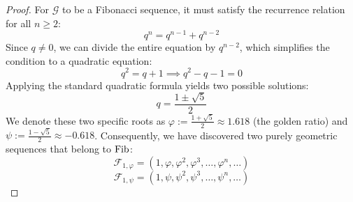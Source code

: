 \begin{proof}
For $\mathcal{G}$ to be a Fibonacci sequence, it must satisfy the recurrence relation for all $n \ge 2$:
\[
q^n = q^{n-1} + q^{n-2}
\]
Since $q \ne 0$, we can divide the entire equation by $q^{n-2}$, which simplifies the condition to a quadratic equation:
\[
q^2 = q + 1 \implies q^2 - q - 1 = 0
\]
Applying the standard quadratic formula yields two possible solutions:
\[
q = \frac{1 \pm \sqrt{5}}{2}
\]
We denote these two specific roots as $\varphi := \frac{1 + \sqrt{5}}{2} \approx 1.618$ (the golden ratio) and $\psi := \frac{1 - \sqrt{5}}{2} \approx -0.618$. Consequently, we have discovered two purely geometric sequences that belong to $\operatorname{Fib}$:
\[
\mathcal{F}_{1, \varphi} = (1, \varphi, \varphi^2, \varphi^3, \dots, \varphi^n, \dots)
\]
\[
\mathcal{F}_{1, \psi} = (1, \psi, \psi^2, \psi^3, \dots, \psi^n, \dots)
\]
\end{proof}

